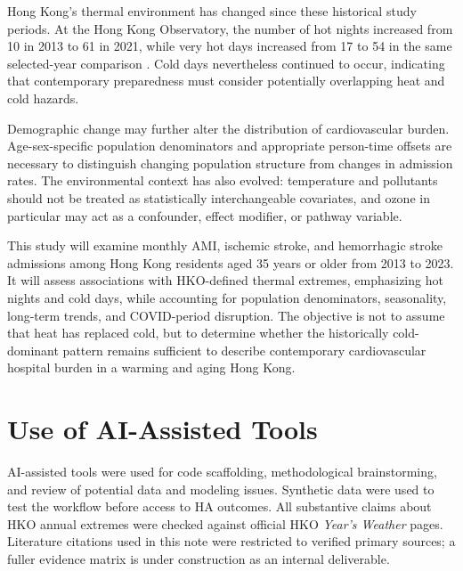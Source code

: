 \documentclass[11pt]{article}
\begin{document}
Hong Kong's thermal environment has changed since these historical study
periods. At the Hong Kong Observatory, the number of hot nights increased from
10 in 2013 to 61 in 2021, while very hot days increased from 17 to 54 in the
same selected-year comparison \cite{hko2013,hko2021}. Cold days nevertheless
continued to occur, indicating that contemporary preparedness must consider
potentially overlapping heat and cold hazards.

Demographic change may further alter the distribution of cardiovascular
burden. Age-sex-specific population denominators and appropriate person-time
offsets are necessary to distinguish changing population structure from
changes in admission rates. The environmental context has also evolved:
temperature and pollutants should not be treated as statistically
interchangeable covariates, and ozone in particular may act as a confounder,
effect modifier, or pathway variable.

This study will examine monthly AMI, ischemic stroke, and hemorrhagic stroke
admissions among Hong Kong residents aged 35 years or older from 2013 to 2023.
It will assess associations with HKO-defined thermal extremes, emphasizing hot
nights and cold days, while accounting for population denominators,
seasonality, long-term trends, and COVID-period disruption. The objective is
not to assume that heat has replaced cold, but to determine whether the
historically cold-dominant pattern remains sufficient to describe
contemporary cardiovascular hospital burden in a warming and aging Hong Kong.

\clearpage
\section{Use of AI-Assisted Tools}

AI-assisted tools were used for code scaffolding, methodological
brainstorming, and review of potential data and modeling issues. Synthetic
data were used to test the workflow before access to HA outcomes. All
substantive claims about HKO annual extremes were checked against official
HKO \textit{Year's Weather} pages. Literature citations used in this note
were restricted to verified primary sources; a fuller evidence matrix is under
construction as an internal deliverable.
\end{document}
